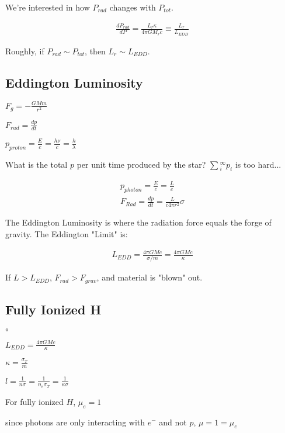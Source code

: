 \documentclass[10pt,letterpaper,final]{book}
\begin{document}
We're interested in how $P_{rad}$ changes with $P_{tot}$. 

\begin{align}
\frac{dP_{rad}}{dP} = \frac{L_r \kappa}{4 \pi G M_r c} \equiv \frac{L_r}{L_{EDD}}
\end{align}

Roughly, if $P_{rad} \sim P_{tot}$, then $L_r \sim L_{EDD}$.

\subsection{Eddington Luminosity}

\begin{list}{}{}
\item $F_g = -\frac{GMm}{r^2}$
\item $F_{rad} = \frac{dp}{dt}$
\item $p_{proton} = \frac{E}{c} = \frac{h \nu}{c} = \frac{h}{\lambda}$
\end{list}

What is the total $p$ per unit time produced by the star? $\sum\limits{_i^\infty} p_i $ is too hard...

\begin{align}
p_{photon} = \frac{E}{c} = \frac{L}{c}\\
F_{Rad} = \frac{dp}{dt} = \frac{L}{c 4\pi r^2} \sigma
\end{align}

The Eddington Luminosity is where the radiation force equals the forge of gravity. The Eddington "Limit" is:

\begin{align}
L_{EDD} = \frac{4 \pi G Mc}{\sigma /m} = \frac{4 \pi G Mc}{\kappa}
\end{align}

If $L > L_{EDD}$, $F_{rad} > F_{grav}$, and material is "blown" out. 

\subsection{Fully Ionized H}

\begin{list}{$\circ$}{}
\item $L_{EDD} = \frac{4 \pi GMc}{\kappa}$
\item $\kappa = \frac{\sigma_T}{m}$
\item $l = \frac{1}{n \sigma} = \frac{1}{n_e \sigma_T} = \frac{1}{\kappa \sigma}$
\item For fully ionized $H$, $\mu_e =1$
\item since photons are only interacting with $e^-$ and not $p$, $\mu = 1 = \mu_e$
\end{list}
\end{document}
